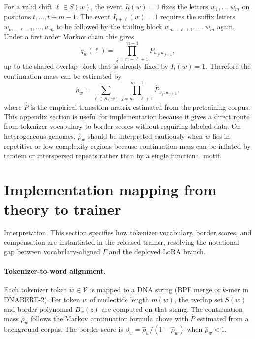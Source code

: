 \documentclass[12pt,letterpaper]{article}
\begin{document}
For a valid shift $\ell \in S(w)$, the event $I_t(w)=1$ fixes the letters $w_1,\ldots,w_m$ on positions $t,\ldots,t+m-1$. The event $I_{t+\ell}(w)=1$ requires the suffix letters $w_{m-\ell+1},\ldots,w_m$ to be followed by the trailing block $w_{m-\ell+1},\ldots,w_m$ again. Under a first order Markov chain this gives
\begin{equation}
q_w(\ell)
=
\prod_{j=m-\ell+1}^{m-1}
P_{w_j,w_{j+1}},
\label{eq:appmarkovq}
\end{equation}
up to the shared overlap block that is already fixed by $I_t(w)=1$. Therefore the continuation mass can be estimated by
\begin{equation}
\widehat{\rho}_w
=
\sum_{\ell \in S(w)}
\prod_{j=m-\ell+1}^{m-1}
\widehat{P}_{w_j,w_{j+1}},
\label{eq:appmarkovrho}
\end{equation}
where $\widehat{P}$ is the empirical transition matrix estimated from the pretraining corpus. This appendix section is useful for implementation because it gives a direct route from tokenizer vocabulary to border scores without requiring labeled data. On heterogeneous genomes, $\widehat{\rho}_w$ should be interpreted cautiously when $w$ lies in repetitive or low-complexity regions because continuation mass can be inflated by tandem or interspersed repeats rather than by a single functional motif.

\section*{Implementation mapping from theory to trainer}\label{app:implementation}

Interpretation. This section specifies how tokenizer vocabulary, border scores, and compensation are instantiated in the released trainer, resolving the notational gap between vocabulary-aligned $\Gamma$ and the deployed LoRA branch.

\paragraph{Tokenizer-to-word alignment.}
Each tokenizer token $w \in \mathcal{V}$ is mapped to a DNA string (BPE merge or $k$-mer in DNABERT-2). For token $w$ of nucleotide length $m(w)$, the overlap set $S(w)$ and border polynomial $B_w(z)$ are computed on that string. The continuation mass $\widehat{\rho}_w$ follows the Markov continuation formula above with $\widehat{P}$ estimated from a background corpus. The border score is $\beta_w = \widehat{\rho}_w / (1-\widehat{\rho}_w)$ when $\widehat{\rho}_w < 1$.
\end{document}

